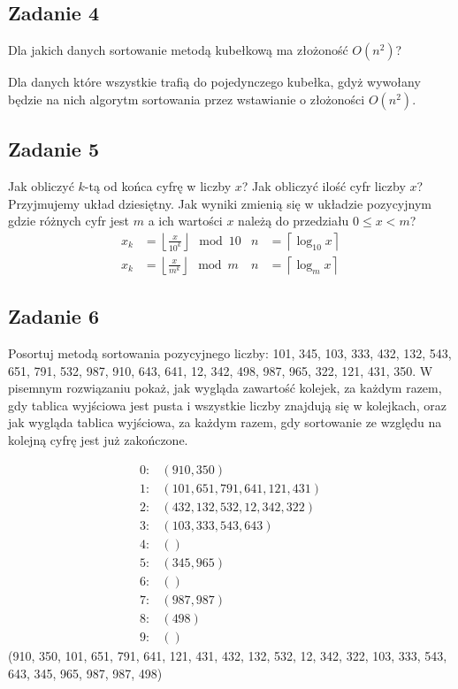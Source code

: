 \documentclass{article}
\begin{document}
\subsection*{Zadanie 4}
Dla jakich danych sortowanie metodą kubełkową ma złożoność $O(n^2)$?
\begin{center}
    Dla danych które wszystkie trafią do pojedynczego kubełka, gdyż wywołany będzie na nich
    algorytm sortowania przez wstawianie o złożoności $O(n^2)$.
\end{center}

\subsection*{Zadanie 5}
Jak obliczyć $k$-tą od końca cyfrę w liczby $x$? Jak obliczyć ilość cyfr liczby $x$? Przyjmujemy
układ dziesiętny. Jak wyniki zmienią się w układzie pozycyjnym gdzie różnych cyfr jest $m$ a ich
wartości $x$ należą do przedziału $0 \leq x < m$?
\begin{align*}
    x_k & = \left \lfloor \frac{x}{10^k} \right \rfloor \mod 10 & n & = \left \lceil \log_{10} x \right \rceil \\
    x_k & = \left \lfloor \frac{x}{m^k} \right \rfloor \mod m   & n & = \left \lceil \log_m x \right \rceil
\end{align*}

\pagebreak
\subsection*{Zadanie 6}
Posortuj metodą sortowania pozycyjnego liczby: 101, 345, 103, 333, 432, 132, 543, 651,
791, 532, 987, 910, 643, 641, 12, 342, 498, 987, 965, 322, 121, 431, 350. W pisemnym
rozwiązaniu pokaż, jak wygląda zawartość kolejek, za każdym razem, gdy tablica
wyjściowa jest pusta i wszystkie liczby znajdują się w kolejkach, oraz jak wygląda
tablica wyjściowa, za każdym razem, gdy sortowanie ze względu na kolejną cyfrę jest już zakończone.

\begin{align*}
    0: & \left(910, 350\right)                     \\
    1: & \left(101, 651, 791, 641, 121, 431\right) \\
    2: & \left(432, 132, 532, 12, 342, 322\right)  \\
    3: & \left(103, 333, 543, 643\right)           \\
    4: & \left(\right)                             \\
    5: & \left(345, 965\right)                     \\
    6: & \left(\right)                             \\
    7: & \left(987, 987\right)                     \\
    8: & \left(498\right)                          \\
    9: & \left(\right)
\end{align*}
(910, 350, 101, 651, 791, 641, 121, 431, 432, 132, 532, 12, 342, 322, 103, 333, 543, 643, 345, 965, 987, 987, 498)
\end{document}
